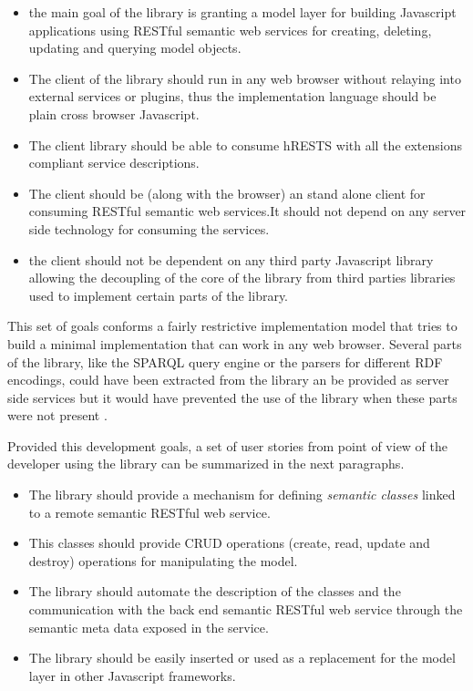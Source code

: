 \begin{itemize}
\item the main goal of the library is granting a model layer for building Javascript applications using RESTful
  semantic web services for creating, deleting, updating and querying model objects.
\item The client of the library should run in any web browser without relaying into external services or plugins, thus
  the implementation language should be plain cross browser Javascript.
\item The client library should be able to consume hRESTS with all the extensions compliant service descriptions.
\item The client should be (along with the browser) an stand alone client for consuming RESTful semantic web services.It should not depend on any server side
  technology for consuming the services.
\item the client should not be dependent on any third party Javascript library allowing the decoupling of the core of the
  library from third parties libraries used to implement certain parts of the library.
\end {itemize}

This set of goals conforms a fairly restrictive implementation model that tries to build a minimal implementation that
can work in any web browser. Several parts of the library, like the SPARQL query engine or the parsers for different RDF
encodings, could have been extracted from the library an be provided as server side services but it would have prevented the
use of the library when these parts were not present .

Provided this development goals, a set of user stories from  point of view of the developer using the library can be
summarized in the next paragraphs.

\begin{itemize}
\item The library should provide a mechanism for defining {\it semantic classes} linked to a remote semantic RESTful web
  service.
\item This classes should provide CRUD operations (create, read, update and destroy) operations for manipulating the
  model.
\item The library should automate the description of the classes and the communication with the back end semantic RESTful
  web service through the semantic meta data exposed in the service.
\item The library should be easily inserted or used as a replacement for the model layer in other Javascript frameworks.
\end{itemize}

